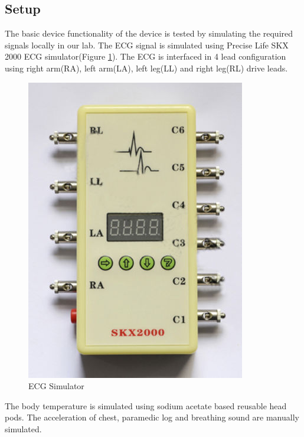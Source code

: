 \subsection{Setup}
The basic device functionality of the device is tested by simulating the required signals locally in our lab. The ECG signal is simulated using Precise Life SKX 2000 ECG simulator(Figure \ref{fig:ecg_sim}). The ECG is interfaced in 4 lead configuration using right arm(RA), left arm(LA), left leg(LL) and right leg(RL) drive leads. 
\begin{figure}[h]
	\centering
	\includegraphics[scale = 0.5 ]{ecg_sim.JPG}
	\caption{ECG Simulator\label{fig:ecg_sim}}
\end{figure}

 The body temperature is simulated using sodium acetate based reusable head pods. The acceleration of chest, paramedic log and breathing sound are manually simulated.

